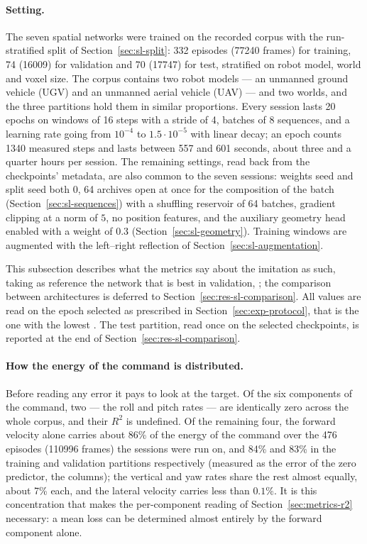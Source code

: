 \paragraph{Setting.}
The seven spatial networks were trained on the recorded corpus with the
run-stratified split of Section~\ref{sec:sl-split}: \num{332} episodes
(\num{77240} frames) for training, \num{74} (\num{16009}) for validation and
\num{70} (\num{17747}) for test, stratified on robot model, world and voxel
size. The corpus contains two robot models --- an unmanned ground vehicle (UGV)
and an unmanned aerial vehicle (UAV) --- and two worlds, and the three
partitions hold them in similar proportions. Every session lasts \num{20}
epochs on windows of \num{16} steps with a stride of \num{4}, batches of
\num{8} sequences, and a learning rate going from $10^{-4}$ to
$1.5\cdot10^{-5}$ with linear decay; an epoch counts \num{1340} measured steps
and lasts between \num{557} and \num{601} seconds, about three and a quarter
hours per session. The remaining settings, read back from the checkpoints'
metadata, are also common to the seven sessions: weights seed and split seed
both $0$, \num{64} archives open at once for the composition of the batch
(Section~\ref{sec:sl-sequences}) with a shuffling reservoir of \num{64}
batches, gradient clipping at a norm of $5$, no position features, and the
auxiliary geometry head enabled with a weight of $0.3$
(Section~\ref{sec:sl-geometry}). Training windows are augmented with the
left--right reflection of Section~\ref{sec:sl-augmentation}.

This subsection describes what the metrics say about the imitation as such,
taking as reference the network that is best in validation,
; the comparison between architectures is deferred to
Section~\ref{sec:res-sl-comparison}. All values are read on the epoch selected
as prescribed in Section~\ref{sec:exp-protocol}, that is the one with the
lowest . The test partition, read once on the selected
checkpoints, is reported at the end of Section~\ref{sec:res-sl-comparison}.

\paragraph{How the energy of the command is distributed.}
Before reading any error it pays to look at the target. Of the six components
of the command, two --- the roll and pitch rates --- are identically zero across
the whole corpus, and their $R^2$ is undefined. Of the remaining four, the
forward velocity alone carries about 86\% of the energy of the command over the
476 episodes (\num{110996} frames) the sessions were run on, and 84\% and 83\%
in the training and validation partitions respectively (measured as the error
of the zero predictor, the  columns); the vertical and yaw
rates share the rest almost equally, about 7\% each, and the lateral velocity
carries less than $0.1\%$. It is this concentration that makes the per-component reading of
Section~\ref{sec:metrics-r2} necessary: a mean loss can be determined almost
entirely by the forward component alone.

